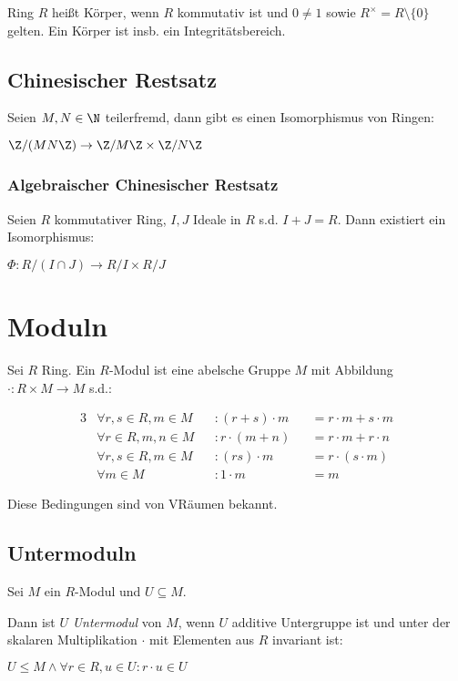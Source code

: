 Ring $R$ heißt Körper, wenn $R$ kommutativ ist und $0 \neq 1$ sowie $R^\times = R \setminus \{0\}$ gelten. Ein Körper ist insb. ein Integritätsbereich.

\subsection*{Chinesischer Restsatz}

Seien $M, N \in \N$ teilerfremd, dann gibt es einen Isomorphismus von Ringen:

$\Z/(MN\Z) \to \Z/M\Z \times \Z/N\Z$

\subsubsection*{Algebraischer Chinesischer Restsatz}

Seien $R$ kommutativer Ring, $I, J$ Ideale in $R$ s.d. $I + J = R$. Dann existiert ein Isomorphismus:

$\Phi : R/(I \cap J) \to R/I \times R/J$

\section*{Moduln}

Sei $R$ Ring. Ein $R$-Modul ist eine abelsche Gruppe $M$ mit Abbildung $\cdot : R \times M \to M$ s.d.:

\vspace*{-4mm}
\begin{alignat*}{3}
	&\forall r, s \in R, m \in M &&: (r+s)\cdot m &&= r\cdot m + s\cdot m \\
	&\forall r \in R, m, n \in M &&: r \cdot (m+n) &&= r\cdot m + r\cdot n \\
	&\forall r, s \in R, m \in M &&: (rs)\cdot m &&= r\cdot(s\cdot m) \\
	&\forall m \in M &&: 1\cdot m &&= m
\end{alignat*}

Diese Bedingungen sind von VRäumen bekannt.

\subsection*{Untermoduln}

Sei $M$ ein $R$-Modul und $U \subseteq M$.

Dann ist $U$ \emph{Untermodul} von $M$, wenn $U$ additive Untergruppe ist und unter der skalaren Multiplikation $\cdot$ mit Elementen aus $R$ invariant ist:

$U \leq M \land \forall r \in R, u \in U : r \cdot u \in U$
